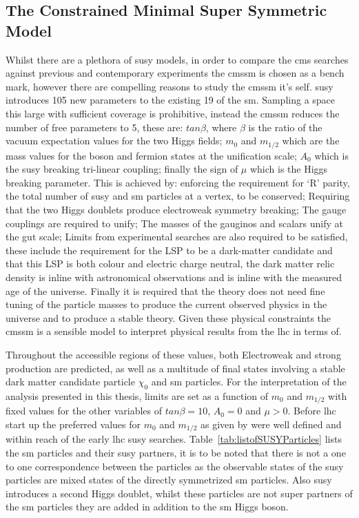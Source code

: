 \subsection{The Constrained Minimal Super Symmetric Model} %
\label{sec:the_constrained_minimal_super_symmetric_model}
Whilst there are a plethora of \ac{susy} models, in order to compare the 
\ac{cms} searches against previous and contemporary experiments the 
\ac{cmssm}\cite{ref:CMSSM} is chosen as a bench mark, however there are 
compelling reasons to study the \ac{cmssm} it's self. \ac{susy} introduces 105 
new parameters to the existing 19 of the \ac{sm}. Sampling a space 
this large with sufficient coverage is prohibitive, instead the \ac{cmssm} 
reduces the number of free parameters to 5, these are: $tan \beta$, where 
$\beta$ is the ratio of the vacuum expectation values for the two Higgs fields; 
$m_{0}$ and $m_{1/2}$ which are the mass values for the boson and fermion 
states at the unification scale; $A_{0}$ which is the \ac{susy} breaking 
tri-linear coupling; finally the sign of $\mu$ which is the Higgs breaking 
parameter. This is achieved by: enforcing the requirement for `R' parity, the  
total number of \ac{susy} and \ac{sm} particles at a vertex, to be conserved; 
Requiring that the two Higgs doublets produce electroweak symmetry breaking; 
The gauge couplings are required to unify; The masses of the gauginos and 
scalars unify at the \ac{gut} scale; Limits from experimental searches are also 
required to be satisfied, these include the requirement for the LSP to be a 
dark-matter candidate and that this LSP is both colour and electric charge 
neutral, the dark matter relic density is inline with astronomical observations 
and is inline with the measured age of the universe. Finally it is required 
that the theory does not need fine tuning of the particle masses to produce the 
current observed physics in the universe and to produce a stable theory.
Given these physical constraints the \ac{cmssm} is a sensible model to 
interpret physical results from the \ac{lhc} in terms of.


Throughout the accessible regions of these values, both Electroweak and 
strong production are predicted, as well as a multitude of final states 
involving a stable dark matter candidate particle $\chi_{0}$ and \ac{sm} 
particles. For the interpretation of the analysis presented in this thesis, 
limits are set as a function of $m_{0}$ and $m_{1/2}$ with fixed values for the 
other variables of $tan \beta = 10$, $A_{0} = 0$ and $\mu > 0$.
Before \ac{lhc} start up the preferred values for $m_{0}$ and $m_{1/2}$ as 
given by \cite{Buchmueller:2011tr} were well defined and within reach of the 
early \ac{lhc} \ac{susy} searches.
Table~\ref{tab:listofSUSYParticles} lists the \ac{sm} particles and their 
\ac{susy} partners, it is to be noted that there is not a one to one 
correspondence between the particles as the observable states of the \ac{susy} 
particles are mixed states of the directly symmetrized \ac{sm} particles. Also 
\ac{susy} introduces a second Higgs doublet, whilst these particles are not 
super partners of the \ac{sm} particles they are added in addition to the 
\ac{sm} Higgs boson.

